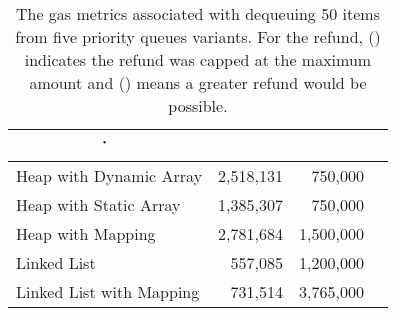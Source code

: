 

\begin{table}[t]
\centering
\begin{tabular}{|l|r|r|r|}

\multicolumn{1}{c}{\.} & \headrow{Gas Costs (\texttt{gasUsed})} & \headrow{Refund (Manual)} & \headrow{Full Refund?} \\ \hline

Heap with Dynamic Array       	& 2,518,131          & 750,000     &\full                  \\ \hline
Heap with Static Array          	& 1,385,307                             & 750,000      &\full                \\ \hline
Heap with Mapping 			& 2,781,684                            & 1,500,000    &\full                 \\ \hline
Linked List                     		& 557,085               	           & 1,200,000      &\full                \\ \hline
Linked List with Mapping      	& 731,514              	     	  &  3,765,000      &\full                 \\ \hline

\end{tabular}
\caption{\footnotesize{The gas metrics associated with dequeuing 50 items from five priority queues variants. For the refund, (\full) indicates the  refund was capped at the maximum amount and (\prt) means a greater refund would be possible.}
\label{tab:PQUnitTests}}
\end{table}


